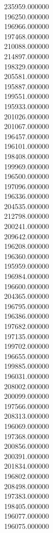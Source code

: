 235959.000000\\
196250.000000\\
196966.000000\\
197468.000000\\
210088.000000\\
214897.000000\\
198329.000000\\
205581.000000\\
195887.000000\\
199551.000000\\
195933.000000\\
201026.000000\\
201067.000000\\
196457.000000\\
196101.000000\\
198408.000000\\
199969.000000\\
196500.000000\\
197096.000000\\
196336.000000\\
204535.000000\\
212798.000000\\
200241.000000\\
209642.000000\\
196208.000000\\
196360.000000\\
195959.000000\\
196984.000000\\
196600.000000\\
204365.000000\\
196795.000000\\
196386.000000\\
197682.000000\\
197135.000000\\
199702.000000\\
196655.000000\\
199885.000000\\
196031.000000\\
208002.000000\\
200099.000000\\
197566.000000\\
208313.000000\\
196069.000000\\
197368.000000\\
200856.000000\\
200391.000000\\
201834.000000\\
196802.000000\\
208498.000000\\
197383.000000\\
198405.000000\\
196077.000000\\
196075.000000\\
